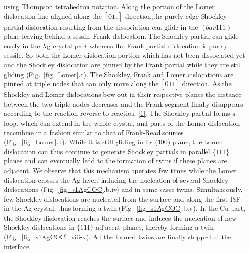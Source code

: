 \documentclass[final,3p,times,twocolumn]{elsarticle}
\begin{document}
using Thompson tetrahedron notation. Along the portion of the Lomer dislocation line aligned along the $\left[01\bar{1}\right]$ direction,the purely edge Shockley partial dislocation resulting from the dissociation can glide in the $\left(bar{1}11\right)$ plane leaving behind a sessile Frank dislocation. The Shockley partial can glide easily in the Ag crystal part whereas the Frank partial dislocation is purely sessile. So both the Lomer dislocation portion which has not been dissociated yet and the Shockley dislocation are pinned by the Frank partial while they are still gliding (Fig.~\ref{fig_Lomer}.c). The Shockley, Frank and Lomer dislocations are pinned at triple nodes that can only move along the $\left[01\bar{1}\right]$ direction. As the Shockley and Lomer dislocations bow out in their respective planes the distance between the two triple nodes decreases and the Frank segment finally disappears according to the reaction reverse to reaction~\ref{1}. The Shockley partial forms a loop, which can extend in the whole crystal, and parts of the Lomer dislocation recombine in a fashion similar to that of Frank-Read sources \citep{frank50} (Fig.~\ref{fig_Lomer}.d). While it is still gliding in its (100) plane, the Lomer dislocation can thus continue to generate Shockley partials in parallel $\lbrace111\rbrace$ planes and can eventually ledd to the formation of twins if these planes are adjacent. We observe that this mechanism operates few times while the Lomer dislocation crosses the Ag layer, inducing the nucleation of several Shockley dislocations (Fig.~\ref{fig_s1AgCOC}.b.iv) and in some cases twins. Simultaneously, few Shockley dislocations are nucleated from the surface and along the first ISF in the Ag crystal, thus forming a twin (Fig.~\ref{fig_s1AgCOC}.b.v). In the Cu part, the Shockley dislocation reaches the surface and induces the nucleation of new Shockley dislocations in $\lbrace111\rbrace$ adjacent planes, thereby forming a twin (Fig.~\ref{fig_s1AgCOC}.b.iii-v). All the formed twins are finally stopped at the interface.
\end{document}
